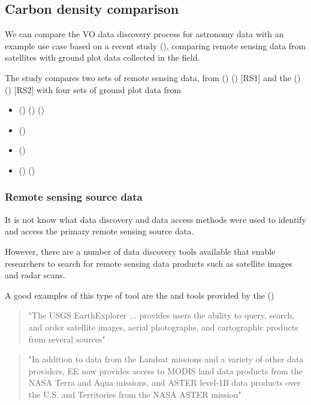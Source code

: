 \documentclass{article}
\begin{document}
\subsection{Carbon density comparison}

We can compare the VO data discovery process for astronomy data with an example
use case based on a recent study
 (\cite{mitchard-2014}),
comparing remote sensing data from satellites with ground plot data collected
in the field.

The study compares two sets of remote sensing data, from
 (\cite{nasa-jpl-carbon})
 (\cite{saatchi-2011}) [RS1]
and the
 (\cite{whrc})
 (\cite{baccini-2012}) [RS2]
with four sets of ground plot data from

\begin{itemize}
\item{} (\cite{rainfor}) (\cite{peacock-2007}) (\cite{malhi-2009})
\item{} (\cite{atdn})
\item{} (\cite{team})
\item{} (\cite{ppbio}) (\cite{pezzini-2012})
\end{itemize}

\subsubsection{Remote sensing source data}

It is not know what data discovery and data access methods were used to
identify and access the primary remote sensing source data.

However, there are a number of data discovery tools available that enable
researchers to search for remote sensing data products such as satellite
images and radar scans.

A good examples of this type of tool are the
\cite{usgs-explorer}
and
\cite{usgs-glovis}
tools provided by the
 (\cite{usgs})
    
\begin{quote}
"The USGS EarthExplorer ... provides users the ability to query, search,
and order satellite images, aerial photographs, and cartographic products from
several sources"
\end{quote}

\begin{quote}
"In addition to data from the Landsat missions and a variety of other data providers,
EE now provides access to MODIS land data products from the NASA Terra and Aqua missions,
and ASTER level-1B data products over the U.S. and Territories from the NASA ASTER mission"
\end{quote}
\end{document}
